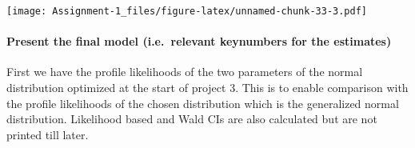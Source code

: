 \documentclass[
]{article}
\begin{document}
\texttt{[image: Assignment-1\_files/figure-latex/unnamed-chunk-33-3.pdf]}

\hypertarget{present-the-final-model-i.e.-relevant-keynumbers-for-the-estimates}{%
\paragraph{Present the final model (i.e.~relevant keynumbers for the
estimates)}\label{present-the-final-model-i.e.-relevant-keynumbers-for-the-estimates}}

First we have the profile likelihoods of the two parameters of the
normal distribution optimized at the start of project 3. This is to
enable comparison with the profile likelihoods of the chosen
distribution which is the generalized normal distribution. Likelihood
based and Wald CIs are also calculated but are not printed till later.
\end{document}
